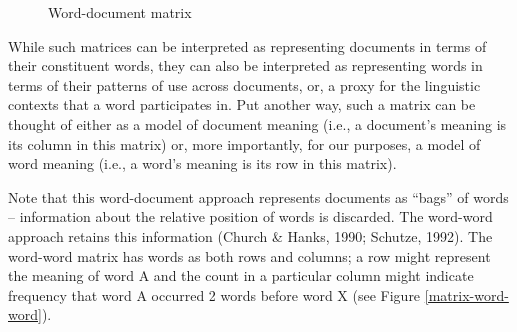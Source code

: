 \documentclass[man,floatsintext]{apa6}
\begin{document}
\begin{figure}
  \begin{center}
    \footnotesize{}
  \end{center}
  \caption{Word-document matrix}
  \label{matrix-word-doc}
\end{figure}

While such matrices can be interpreted as representing documents in
terms of their constituent words, they can also be interpreted as
representing words in terms of their patterns of use across documents,
or, a proxy for the linguistic contexts that a word participates
in. Put another way, such a matrix can be thought of either as a model
of document meaning (i.e., a document's meaning is its column in this
matrix) or, more importantly, for our purposes, a model of word
meaning (i.e., a word's meaning is its row in this matrix).

Note that this word-document approach represents documents as ``bags'' of words --
information about the relative position of words is discarded. The word-word
approach retains this information (Church \&
Hanks, 1990; Schutze, 1992). The word-word 
matrix has words as both rows and columns; a row might represent the
meaning of word A and the count in a particular column might indicate
frequency that word A occurred 2 words before word X (see Figure
\ref{matrix-word-word}). 
\end{document}
